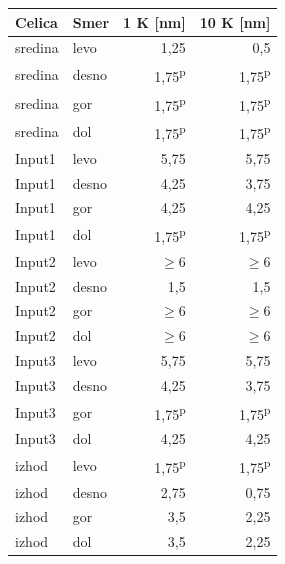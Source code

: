 \begin{tabular}{llrr}
\toprule
Celica & Smer & 1 K [nm] & 10 K [nm] \\
\midrule
sredina & levo & 1{,}25 & 0{,}5 \\
sredina & desno & 1{,}75\textsuperscript{p} & 1{,}75\textsuperscript{p} \\
sredina & gor & 1{,}75\textsuperscript{p} & 1{,}75\textsuperscript{p} \\
sredina & dol & 1{,}75\textsuperscript{p} & 1{,}75\textsuperscript{p} \\
\midrule
Input1 & levo & 5{,}75 & 5{,}75 \\
Input1 & desno & 4{,}25 & 3{,}75 \\
Input1 & gor & 4{,}25 & 4{,}25 \\
Input1 & dol & 1{,}75\textsuperscript{p} & 1{,}75\textsuperscript{p} \\
\midrule
Input2 & levo & $\geq 6$ & $\geq 6$ \\
Input2 & desno & 1{,}5 & 1{,}5 \\
Input2 & gor & $\geq 6$ & $\geq 6$ \\
Input2 & dol & $\geq 6$ & $\geq 6$ \\
\midrule
Input3 & levo & 5{,}75 & 5{,}75 \\
Input3 & desno & 4{,}25 & 3{,}75 \\
Input3 & gor & 1{,}75\textsuperscript{p} & 1{,}75\textsuperscript{p} \\
Input3 & dol & 4{,}25 & 4{,}25 \\
\midrule
izhod & levo & 1{,}75\textsuperscript{p} & 1{,}75\textsuperscript{p} \\
izhod & desno & 2{,}75 & 0{,}75 \\
izhod & gor & 3{,}5 & 2{,}25 \\
izhod & dol & 3{,}5 & 2{,}25 \\
\bottomrule
\end{tabular}
